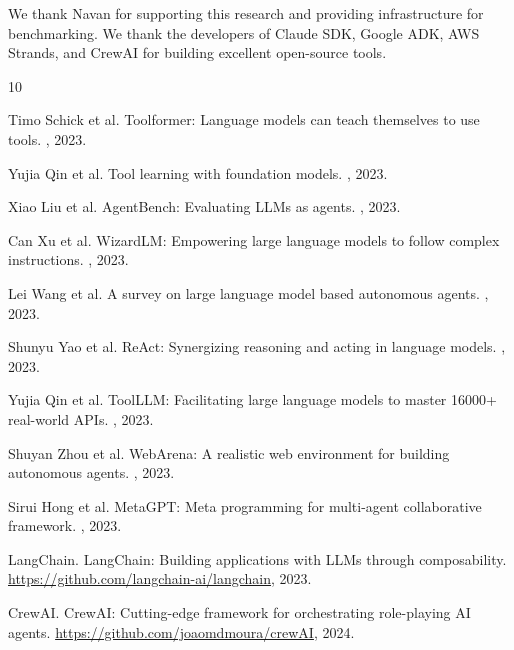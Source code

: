\documentclass[sigconf,nonacm]{acmart}
\begin{document}
We thank Navan for supporting this research and providing infrastructure for benchmarking. We thank the developers of Claude SDK, Google ADK, AWS Strands, and CrewAI for building excellent open-source tools.


\begin{thebibliography}{10}

Timo Schick et al.
\newblock Toolformer: Language models can teach themselves to use tools.
, 2023.

Yujia Qin et al.
\newblock Tool learning with foundation models.
, 2023.

Xiao Liu et al.
\newblock AgentBench: Evaluating LLMs as agents.
, 2023.

Can Xu et al.
\newblock WizardLM: Empowering large language models to follow complex instructions.
, 2023.

Lei Wang et al.
\newblock A survey on large language model based autonomous agents.
, 2023.

Shunyu Yao et al.
\newblock ReAct: Synergizing reasoning and acting in language models.
, 2023.

Yujia Qin et al.
\newblock ToolLLM: Facilitating large language models to master 16000+ real-world APIs.
, 2023.

Shuyan Zhou et al.
\newblock WebArena: A realistic web environment for building autonomous agents.
, 2023.

Sirui Hong et al.
\newblock MetaGPT: Meta programming for multi-agent collaborative framework.
, 2023.

LangChain.
\newblock LangChain: Building applications with LLMs through composability.
\newblock \url{https://github.com/langchain-ai/langchain}, 2023.

CrewAI.
\newblock CrewAI: Cutting-edge framework for orchestrating role-playing AI agents.
\newblock \url{https://github.com/joaomdmoura/crewAI}, 2024.


\end{thebibliography}
\end{document}
